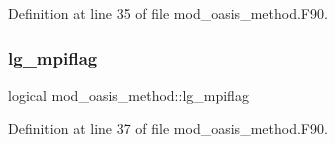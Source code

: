 Definition at line 35 of file mod\+\_\+oasis\+\_\+method.\+F90.

\mbox{\label{namespacemod__oasis__method_a405af91a0535e4ce70d55513bb4c3867}} 
\subsubsection{\texorpdfstring{lg\+\_\+mpiflag}{lg\_mpiflag}}
{\footnotesize\ttfamily logical mod\+\_\+oasis\+\_\+method\+::lg\+\_\+mpiflag\hspace{0.3cm}{\ttfamily [private]}}



Definition at line 37 of file mod\+\_\+oasis\+\_\+method.\+F90.

